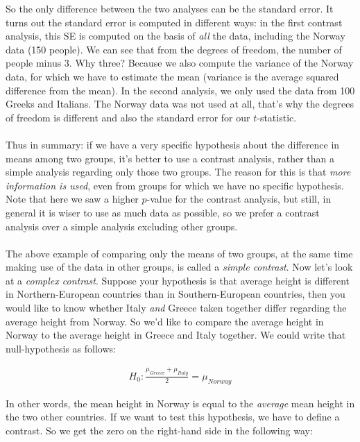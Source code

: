 So the only difference between the two analyses can be the standard error. It turns out the standard error is computed in different ways: in the first contrast analysis, this SE is computed on the basis of \textit{all} the data, including the Norway data (150 people). We can see that from the degrees of freedom, the number of people minus 3. Why three? Because we also compute the variance of the Norway data, for which we have to estimate the mean (variance is the average squared difference from the mean). In the second analysis, we only used the data from 100 Greeks and Italians. The Norway data was not used at all, that's why the degrees of freedom is different and also the standard error for our $t$-statistic. 
\\
\\
Thus in summary: if we have a very specific hypothesis about the difference in means among two groups, it's better to use a contrast analysis, rather than a simple analysis regarding only those two groups. The reason for this is that \textit{more information is used}, even from groups for which we have no specific hypothesis. 
\\
Note that here we saw a higher $p$-value for the contrast analysis, but still, in general it is wiser to use as much data as possible, so we prefer a contrast analysis over a simple analysis excluding other groups.
\\
\\
The above example of comparing only the means of two groups, at the same time making use of the data in other groups, is called a \textit{simple contrast}. Now let's look at a \textit{complex contrast}. Suppose your hypothesis is that average height is different in Northern-European countries than in Southern-European countries, then you would like to know whether Italy \textit{and} Greece taken together differ regarding the average height from Norway. So we'd like to compare the average height in Norway to the average height in Greece and Italy together. We could write that null-hypothesis as follows:

\begin{eqnarray}
H_0 : \frac{\mu_{Greece}+ \mu_{Italy}}{2} = \mu_{Norway}
\end{eqnarray}


In other words, the mean height in Norway is equal to the \textit{average} mean height in the two other countries. If we want to test this hypothesis, we have to define a contrast. So we get the zero on the right-hand side in the following way:

